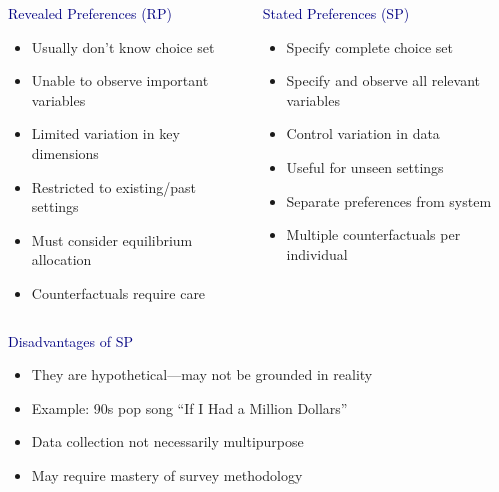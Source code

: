 \documentclass[aspectratio=169]{beamer}
\begin{document}
\begin{frame}
\begin{columns}[T]
\begin{column}{0.48\textwidth}
\begin{center}
\textcolor{navy}{Revealed Preferences (RP)}
\end{center}
\begin{itemize}
\itemsep1em
\item<2-> Usually don't know choice set
\item<3-> Unable to observe important variables
\item<4-> Limited variation in key dimensions
\item<5-> Restricted to existing/past settings
\item<6-> Must consider equilibrium allocation
\item<7-> Counterfactuals require care
\end{itemize}
\end{column}

\begin{column}{0.48\textwidth}
\begin{center}
\textcolor{navy}{Stated Preferences (SP)}
\end{center}
\begin{itemize}
\itemsep1em
\item<2-> Specify complete choice set
\item<3-> Specify and observe all relevant variables
\item<4-> Control variation in data
\item<5-> Useful for unseen settings
\item<6-> Separate preferences from system
\item<7-> Multiple counterfactuals per individual
\end{itemize}
\end{column}
\end{columns}

\end{frame}

\begin{frame}

\textcolor{navy}{Disadvantages of SP}

\bigskip

\begin{itemize}
\itemsep1.5em
\item<2-> They are hypothetical---may not be grounded in reality
\item<3-> Example: 90s pop song ``If I Had a Million Dollars''
\item<4-> Data collection not necessarily multipurpose
\item<5-> May require mastery of survey methodology
\end{itemize}

\end{frame}
\end{document}
